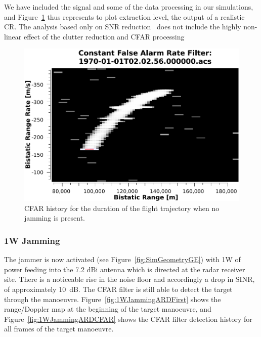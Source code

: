 \documentclass[conference]{IEEEtran}
\begin{document}
We have included the signal and some of the data processing in our simulations, and Figure~\ref{fig:NoJammingARDCFAR} thus represents to plot extraction level, the output of a realistic CR. The analysis based only on SNR reduction~\cite[Chapter 6, section 6.7]{willis:07} does not include the highly non-linear effect of the clutter reduction and CFAR processing~\cite{tong:14}

\begin{figure}[htbp]
\begin{center}
\includegraphics[width=1.0\columnwidth]{figs/Simulations/NoJammingCFAR.pdf}
\caption{CFAR history for the duration of the flight trajectory when no jamming is present.}
\label{fig:NoJammingARDCFAR}
\end{center}
\end{figure}


\subsubsection{1W Jamming}

The jammer is now activated (see Figure~\ref{fig:SimGeometryGE}) with 1W of power feeding into the 7.2 dBi antenna which is directed at the radar receiver site. There is a noticeable rise in the noise floor and accordingly a drop in SINR, of approximately 10~dB. The CFAR filter is still able to detect the target through the manoeuvre. Figure~\ref{fig:1WJammingARDFirst} shows the range/Doppler map at the beginning of the target manoeuvre, and Figure~\ref{fig:1WJammingARDCFAR} shows the CFAR filter detection history for all frames of the target manoeuvre.
\end{document}
